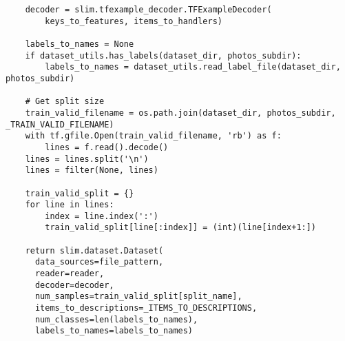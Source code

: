 \begin{lstlisting}
    decoder = slim.tfexample_decoder.TFExampleDecoder(
        keys_to_features, items_to_handlers)

    labels_to_names = None
    if dataset_utils.has_labels(dataset_dir, photos_subdir):
        labels_to_names = dataset_utils.read_label_file(dataset_dir, photos_subdir)

    # Get split size
    train_valid_filename = os.path.join(dataset_dir, photos_subdir, _TRAIN_VALID_FILENAME)
    with tf.gfile.Open(train_valid_filename, 'rb') as f:
        lines = f.read().decode()
    lines = lines.split('\n')
    lines = filter(None, lines)

    train_valid_split = {}
    for line in lines:
        index = line.index(':')
        train_valid_split[line[:index]] = (int)(line[index+1:])

    return slim.dataset.Dataset(
      data_sources=file_pattern,
      reader=reader,
      decoder=decoder,
      num_samples=train_valid_split[split_name],
      items_to_descriptions=_ITEMS_TO_DESCRIPTIONS,
      num_classes=len(labels_to_names),
      labels_to_names=labels_to_names)
\end{lstlisting}

\newpage
